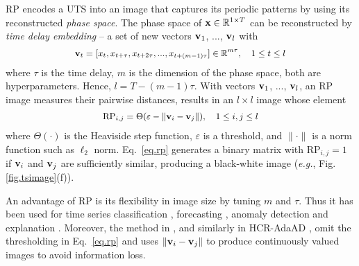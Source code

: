 
RP \cite{eckmann1987recurrence} encodes a UTS into an image that captures its periodic patterns by using its reconstructed {\em phase space}. The phase space of %
${\bf x}\in\mathbb{R}^{1\times T}$ can be reconstructed by {\em time delay embedding} -- a set of new vectors ${\bf v}_{1}$, ..., ${\bf v}_{l}$ with
\begin{equation}\label{eq.de}
\small
\begin{aligned}
{\bf v}_{t}=[x_{t}, x_{t+\tau}, x_{t+2\tau}, ..., x_{t+(m-1)\tau}]\in\mathbb{R}^{m\tau},~~~1\le t \le l
\end{aligned}
\end{equation}
where $\tau$ is the time delay, $m$ is the dimension of the phase space, both %
are hyperparameters. Hence, $l=T-(m-1)\tau$. With vectors ${\bf v}_{1}$, ..., ${\bf v}_{l}$, an RP image %
measures their pairwise distances, results in an $l\times l$ image whose element
\begin{equation}\label{eq.rp}
\small
\begin{aligned}
\text{RP}_{i,j}=\Theta(\varepsilon - \|{\bf v}_{i} - {\bf v}_{j}\|),~~~1\le i,j\le l
\end{aligned}
\end{equation}
where $\Theta(\cdot)$ is the Heaviside step function, $\varepsilon$ is a threshold, and $\|\cdot\|$ is a norm function such as $\ell_{2}$ norm. Eq.~\eqref{eq.rp} %
generates a binary matrix with $\text{RP}_{i,j}=1$ if ${\bf v}_{i}$ and ${\bf v}_{j}$ are sufficiently similar, producing a black-white image ({\em e.g.}, Fig. \ref{fig.tsimage}(f)).%

An advantage of RP is its flexibility in image size by tuning $m$ and $\tau$. Thus it has been used for time series classification %
\cite{silva2013time,hatami2018classification}, forecasting \cite{li2020forecasting}, anomaly detection \cite{lin2024hierarchical} and %
explanation \cite{kim2024cafo}. Moreover, the method in \cite{hatami2018classification}, and similarly in HCR-AdaAD \cite{lin2024hierarchical}, omit the thresholding in Eq.~\eqref{eq.rp} and uses $\|{\bf v}_{i} - {\bf v}_{j}\|$ to produce continuously valued images %
to avoid information loss.



